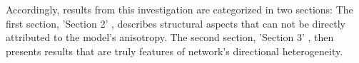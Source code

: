Accordingly, results from this investigation are categorized in two
sections: The first section, 'Section 2' %
, describes structural aspects that can not be directly attributed to
the model's anisotropy. The second section, 'Section 3' %
, then presents results that are truly features of network's
directional heterogeneity.

